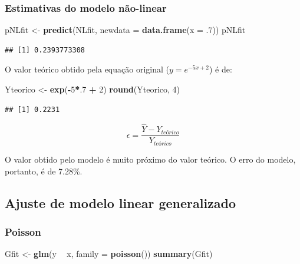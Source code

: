 \documentclass[a4paper]{article}
\newenvironment{Shaded}{\begin{snugshade}}{\end{snugshade}}
\newcommand{\KeywordTok}[1]{\textcolor[rgb]{0.13,0.29,0.53}{\textbf{#1}}}
\newcommand{\DataTypeTok}[1]{\textcolor[rgb]{0.13,0.29,0.53}{#1}}
\newcommand{\DecValTok}[1]{\textcolor[rgb]{0.00,0.00,0.81}{#1}}
\newcommand{\StringTok}[1]{\textcolor[rgb]{0.31,0.60,0.02}{#1}}
\newcommand{\OperatorTok}[1]{\textcolor[rgb]{0.81,0.36,0.00}{\textbf{#1}}}
\newcommand{\NormalTok}[1]{#1}
\begin{document}
\subsubsection{Estimativas do modelo
não-linear}\label{estimativas-do-modelo-nao-linear}

\begin{Shaded}
\begin{Highlighting}[]
\NormalTok{pNLfit <-}\StringTok{ }\KeywordTok{predict}\NormalTok{(NLfit, }\DataTypeTok{newdata =} \KeywordTok{data.frame}\NormalTok{(}\DataTypeTok{x =}\NormalTok{ .}\DecValTok{7}\NormalTok{))}
\NormalTok{pNLfit}
\end{Highlighting}
\end{Shaded}

\begin{verbatim}
## [1] 0.2393773308
\end{verbatim}

O valor teórico obtido pela equação original (\(y = e^{-5x + 2}\)) é de:

\begin{Shaded}
\begin{Highlighting}[]
\NormalTok{Yteorico <-}\StringTok{ }\KeywordTok{exp}\NormalTok{(}\OperatorTok{-}\DecValTok{5}\OperatorTok{*}\NormalTok{.}\DecValTok{7} \OperatorTok{+}\StringTok{ }\DecValTok{2}\NormalTok{)}
\KeywordTok{round}\NormalTok{(Yteorico, }\DecValTok{4}\NormalTok{)}
\end{Highlighting}
\end{Shaded}

\begin{verbatim}
## [1] 0.2231
\end{verbatim}

\[\epsilon = \frac{\hat{Y} - Y_{teórico}}{Y_{teórico}}\]

O valor obtido pelo modelo é muito próximo do valor teórico. O erro do
modelo, portanto, é de 7.28\%.

\subsection{Ajuste de modelo linear
generalizado}\label{ajuste-de-modelo-linear-generalizado}

\subsubsection{Poisson}\label{poisson}

\begin{Shaded}
\begin{Highlighting}[]
\NormalTok{Gfit <-}\StringTok{ }\KeywordTok{glm}\NormalTok{(y }\OperatorTok{~}\StringTok{ }\NormalTok{x, }\DataTypeTok{family =} \KeywordTok{poisson}\NormalTok{())}
\KeywordTok{summary}\NormalTok{(Gfit)}
\end{Highlighting}
\end{Shaded}
\end{document}
